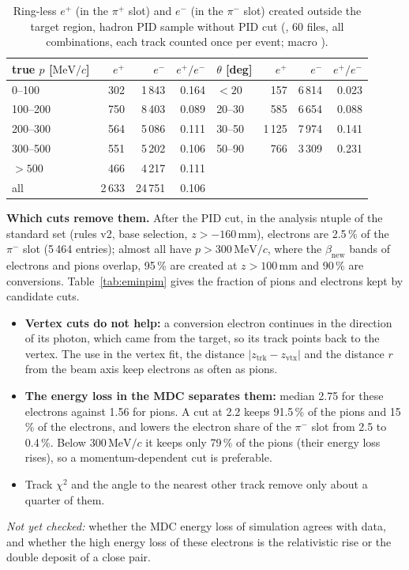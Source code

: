 \documentclass[11pt,a4paper]{article}
\newcommand{\pip}{\ensuremath{\pi^{+}}\xspace}
\newcommand{\pim}{\ensuremath{\pi^{-}}\xspace}
\newcommand{\betanew}{\ensuremath{\beta_{\mathrm{new}}}\xspace}
\newcommand{\MeVc}{\ensuremath{\mathrm{MeV}/c}\xspace}
\newcommand{\code}[1]{\texttt{\detokenize{#1}}}
\begin{document}
\begin{table}[H]
\centering
\caption{Ring-less $e^+$ (in the \pip slot) and $e^-$ (in the \pim slot) created outside the target
region, hadron PID sample without PID cut (\code{HH_elossfix}, 60 files, all combinations, each
track counted once per event; macro \code{macros/asym.C}).}
\label{tab:asym}
\small
\begin{tabular}{@{}l r r r@{\qquad}l r r r@{}}
\toprule
true $p$ [\MeVc] & $e^+$ & $e^-$ & $e^+/e^-$ & $\theta$ [deg] & $e^+$ & $e^-$ & $e^+/e^-$ \\
\midrule
0--100    & 302 & 1\,843 & 0.164 & $<20$  & 157 & 6\,814 & 0.023 \\
100--200  & 750 & 8\,403 & 0.089 & 20--30 & 585 & 6\,654 & 0.088 \\
200--300  & 564 & 5\,086 & 0.111 & 30--50 & 1\,125 & 7\,974 & 0.141 \\
300--500  & 551 & 5\,202 & 0.106 & 50--90 & 766 & 3\,309 & 0.231 \\
$>500$    & 466 & 4\,217 & 0.111 & & & & \\
\midrule
all       & 2\,633 & 24\,751 & 0.106 & & & & \\
\bottomrule
\end{tabular}
\end{table}

\textbf{Which cuts remove them.} After the PID cut, in the analysis ntuple of the standard set
(rules v2, base selection, $z>-160$\,mm), electrons are 2.5\,\% of the \pim slot (5\,464 entries); almost
all have $p>300$\,\MeVc, where the $\betanew$ bands of electrons and pions overlap, 95\,\% are
created at $z>100$\,mm and 90\,\% are conversions. Table~\ref{tab:eminpim} gives the fraction of
pions and electrons kept by candidate cuts.
\begin{itemize}
\item \textbf{Vertex cuts do not help:} a conversion electron continues in the direction of its
      photon, which came from the target, so its track points back to the vertex. The use in the
      vertex fit, the distance $|z_{\mathrm{trk}}-z_{\mathrm{vtx}}|$ and the distance $r$ from the beam
      axis keep electrons as often as pions.
\item \textbf{The energy loss in the MDC separates them:} median 2.75 for these electrons against 1.56
      for pions. A cut at 2.2 keeps 91.5\,\% of the pions and 15\,\% of the electrons, and lowers the
      electron share of the \pim slot from 2.5 to 0.4\,\%. Below 300\,\MeVc it keeps only 79\,\% of the
      pions (their energy loss rises), so a momentum-dependent cut is preferable.
\item Track $\chi^2$ and the angle to the nearest other track remove only about a quarter of them.
\end{itemize}
\emph{Not yet checked:} whether the MDC energy loss of simulation agrees with data, and whether the
high energy loss of these electrons is the relativistic rise or the double deposit of a close pair.
\end{document}
